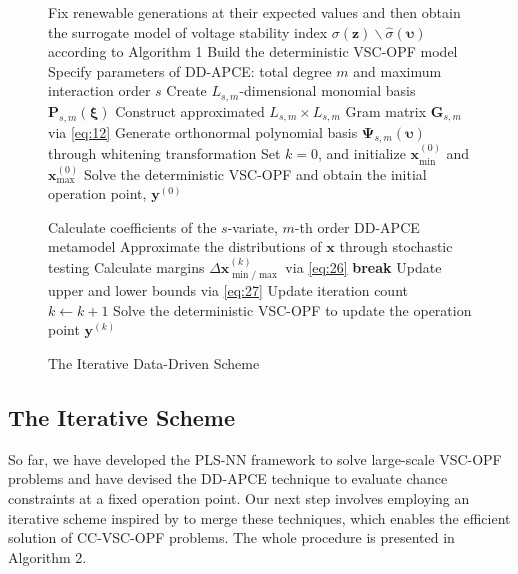 \documentclass[journal]{IEEEtran}
\makeatletter
\theoremstyle{definition}
\theoremstyle{remark}
\newcommand{\removelatexerror}{\let\@latex@error\@gobble}
\makeatother
\begin{document}
\begin{figure}[!t]
    \removelatexerror
     \begin{algorithm}[H]
        \caption{The Iterative Data-Driven Scheme}
        Fix renewable generations at their expected values and then obtain the surrogate model of voltage stability index $\sigma(\boldsymbol{z})\backslash\hat{\sigma}(\boldsymbol{\upsilon})$ according to Algorithm 1\;
        Build the deterministic VSC-OPF model\;
        Specify parameters of DD-APCE: total degree $m$ and maximum interaction order $s$\;
        Create $L_{s,m}$-dimensional monomial basis $\boldsymbol{P}_{s,m}(\boldsymbol{\xi })$\;
        Construct approximated $L_{s,m}\times L_{s,m}$ Gram matrix $\boldsymbol{G}_{s,m}$ via \eqref{eq:12}\;
        Generate orthonormal polynomial basis $\boldsymbol{\Psi}_{s,m}(\boldsymbol{\upsilon})$ through whitening transformation\;
               Set $k=0$, and initialize $\boldsymbol{x}_{\min}^{(0)}$ and $\boldsymbol{x}_{\max}^{(0)}$\; 
        Solve the deterministic VSC-OPF and obtain the initial operation point, $\boldsymbol{y}^{(0)}$ \;
        {
                               Calculate coefficients of the $s$-variate, $m$-th order DD-APCE metamodel\;
                Approximate the distributions of $\boldsymbol{x}$ through stochastic testing\;
                Calculate margins $\Delta\boldsymbol{x}_{\min/\max}^{(k)}$ via \eqref{eq:26}\;
                {
                \textbf{break}\;
                }{
                Update upper and lower bounds via \eqref{eq:27}\;
                Update iteration count $k\gets k+1$\;
                Solve the deterministic VSC-OPF to update the operation point $\boldsymbol{y}^{(k)}$
                }
                           
        }
     \end{algorithm}
     \vspace{-10pt}
\end{figure}
\subsection{The Iterative Scheme}
So far, we have developed the PLS-NN framework to solve large-scale VSC-OPF problems and have devised the DD-APCE technique to evaluate chance constraints at a fixed operation point. Our next step involves employing an iterative scheme inspired by \cite{roald2018chance} to merge these techniques, which enables the efficient solution of CC-VSC-OPF problems. The whole procedure is presented in Algorithm 2.
\end{document}
